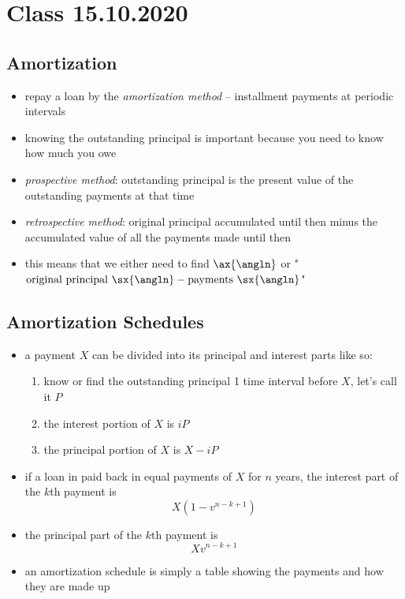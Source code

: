 \documentclass[../00_main.tex]{subfiles}
\begin{document}
\section{Class 15.10.2020}

\subsection{Amortization}

\begin{itemize}
    \item repay a loan by the \textit{amortization method} -- installment
        payments at periodic intervals
    \item knowing the outstanding principal is important because you need to
        know how much you owe
    \item \textit{prospective method}: outstanding principal is the present
        value of the outstanding payments at that time
    \item \textit{retrospective method}: original principal accumulated until
        then minus the accumulated value of all the payments made until then
    \item this means that we either need to find $\ax{\angln}$ or
        "$\text{original principal }\sx{\angln} -
        \text{payments }\sx{\angln}$"
\end{itemize}

\subsection{Amortization Schedules}

\begin{itemize}
    \item a payment $X$ can be divided into its principal and interest parts
        like so:
        \begin{enumerate}
            \item know or find the outstanding principal 1 time interval before
                $X$, let's call it $P$
            \item the interest portion of $X$ is $iP$
            \item the principal portion of $X$ is $X - iP$
        \end{enumerate}
    \item if a loan in paid back in equal payments of $X$ for $n$ years, the
        interest part of the $k$th payment is
        \begin{equation}\nonumber
            X(1-v^{n-k+1})
        \end{equation}
    \item the principal part of the $k$th payment is
        \begin{equation}\nonumber
            Xv^{n-k+1}
        \end{equation}
    \item an amortization schedule is simply a table showing the payments and
        how they are made up
\end{itemize}
\end{document}
